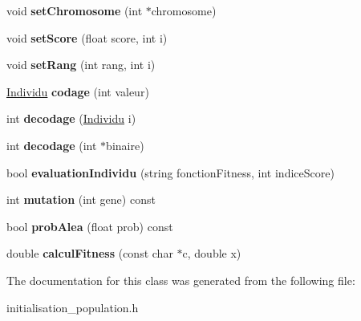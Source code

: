 \begin{DoxyCompactItemize}
void {\bfseries set\+Chromosome} (int $\ast$chromosome)
\item 
\mbox{\label{class_individu_a8904ed048934023929957f6585bc1f7f}} 
void {\bfseries set\+Score} (float score, int i)
\item 
\mbox{\label{class_individu_ae77745a63cacfdd4504f23ed75e7fca0}} 
void {\bfseries set\+Rang} (int rang, int i)
\item 
\mbox{\label{class_individu_a4e531bc1f39a0f9684b8c9d75fb0fcd1}} 
\hyperlink{class_individu}{Individu} {\bfseries codage} (int valeur)
\item 
\mbox{\label{class_individu_a55c07f1851d61efae66419f76db56650}} 
int {\bfseries decodage} (\hyperlink{class_individu}{Individu} i)
\item 
\mbox{\label{class_individu_ae1312d4f3e30f04bbfdac807ec68b7b6}} 
int {\bfseries decodage} (int $\ast$binaire)
\item 
\mbox{\label{class_individu_a85811f58ed4c57e4ae584117d553cc7c}} 
bool {\bfseries evaluation\+Individu} (string fonction\+Fitness, int indice\+Score)
\item 
\mbox{\label{class_individu_aaff224cb5b2c74d327d71c89e7494c84}} 
int {\bfseries mutation} (int gene) const
\item 
\mbox{\label{class_individu_aa370ed54c9e5cecffc479b5874e9226b}} 
bool {\bfseries prob\+Alea} (float prob) const
\item 
\mbox{\label{class_individu_ad050d9721d6f34ff662c1a70af1594a6}} 
double {\bfseries calcul\+Fitness} (const char $\ast$c, double x)
\end{DoxyCompactItemize}


The documentation for this class was generated from the following file\+:\begin{DoxyCompactItemize}
\item 
initialisation\+\_\+population.\+h\end{DoxyCompactItemize}
